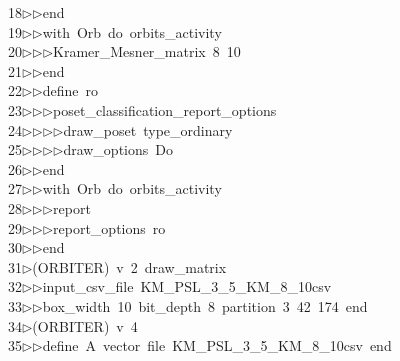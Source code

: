 \begin{tabbing}
18\>$\triangleright$\>$\triangleright$\>end\ \\[0pt]
19\>$\triangleright$\>$\triangleright$\>with\ Orb\ do\ orbits\_activity\ \\[0pt]
20\>$\triangleright$\>$\triangleright$\>$\triangleright$\>Kramer\_Mesner\_matrix\ 8\ 10\ \\[0pt]
21\>$\triangleright$\>$\triangleright$\>end\ \\[0pt]
22\>$\triangleright$\>$\triangleright$\>define\ ro\ \\[0pt]
23\>$\triangleright$\>$\triangleright$\>$\triangleright$\>poset\_classification\_report\_options\ \\[0pt]
24\>$\triangleright$\>$\triangleright$\>$\triangleright$\>$\triangleright$\>draw\_poset\ type\_ordinary\ \\[0pt]
25\>$\triangleright$\>$\triangleright$\>$\triangleright$\>$\triangleright$\>draw\_options\ Do\ \\[0pt]
26\>$\triangleright$\>$\triangleright$\>end\ \\[0pt]
27\>$\triangleright$\>$\triangleright$\>with\ Orb\ do\ orbits\_activity\ \\[0pt]
28\>$\triangleright$\>$\triangleright$\>$\triangleright$\>report\ \ \\[0pt]
29\>$\triangleright$\>$\triangleright$\>$\triangleright$\>report\_options\ ro\ \\[0pt]
30\>$\triangleright$\>$\triangleright$\>end\ \\[0pt]
31\>$\triangleright$\>(ORBITER)\ v\ 2\ draw\_matrix\ \\[0pt]
32\>$\triangleright$\>$\triangleright$\>input\_csv\_file\ KM\_PSL\_3\_5\_KM\_8\_10csv\ \\[0pt]
33\>$\triangleright$\>$\triangleright$\>box\_width\ 10\ bit\_depth\ 8\ partition\ 3\ 42\ 174\ end\\[0pt]
34\>$\triangleright$\>(ORBITER)\ v\ 4\ \\[0pt]
35\>$\triangleright$\>$\triangleright$\>define\ A\ vector\ file\ KM\_PSL\_3\_5\_KM\_8\_10csv\ end\ \\[0pt]

\end{tabbing}
